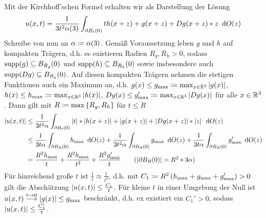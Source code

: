 \begin{exercisePage}
	Mit der Kirchhoff'schen Formel erhalten wir als Darstellung der Lösung
	\begin{equation*}
		u(x,t) = \frac{1}{3 t^2 \alpha(3)} \int_{\partial B_t(0)} t h(x+z) + g(x+z) + Dg(x+z) * z \enskip \mathrm{d}O(z)
	\end{equation*}
	Schreibe von nun an $\alpha \coloneqq \alpha(3)$. Gemäß Voraussetzung leben $g$ und $h$ auf kompakten Trägern, d.h. es existieren Radien $R_g, R_h >0$, sodass $\operatorname{supp}(g) \subseteq B_{R_g}(0)$ und $\operatorname{supp}(h) \subseteq B_{R_h}(0)$ sowie insbesondere auch $\operatorname{supp}(Dg) \subseteq B_{R_g}(0)$. Auf diesen kompakten Trägern nehmen die stetigen Funktionen auch ein Maximum an, d.h. $g(x) \le g_{\max} \coloneqq \max_{x \in \mathbb{R}^3}\left| g(x) \right|$, $h(x) \le h_{\max} \coloneqq \max_{x \in \mathbb{R}^3}\left| h(x) \right|$, $Dg(x) \le g'_{\max} \coloneqq \max_{x \in \mathbb{R}^3}\left| Dg(x) \right|$ für alle $x \in \mathbb{R}^3$. 
	Dann gilt mit $R \coloneqq \max\left\{ R_g, R_h \right\}$ für $t \le R$
	\begin{align*}
			\abs{u(x,t)} 
			&\le \frac{1}{3 t^2 \alpha} \int_{\rand B_t(0)} \abs{t} * \abs{h(x + z)} + \abs{g(x + z)} + \abs{Dg(x+z)} * \abs{z} \diffskip{O(z)} \\
			&\le \frac{1}{3 t \alpha} \int_{\rand B_R(0)} h_{\max} \diffskip{O(z)}
			+ \frac{1}{3 t^2 \alpha} \int_{\rand B_R(0)} g_{\max} \diffskip{O(z)}
			+ \frac{1}{3 t \alpha} \int_{\rand B_R(0)} g'_{\max} \diffskip{O(z)}\\
			&= \frac{R^2 h_{\max}}{t} + \frac{R^2 h_{\max}}{t^2} + \frac{R^2 g'_{\max}}{t} \tag{$\abs{\rand B_R(0)} = R^2 * 3\alpha$}
	\end{align*}
	Für hinreichend große $t$ ist $\frac{1}{t} \approx \frac{1}{t^2}$, d.h. mit $C_1 \coloneqq R^2 \left( h_{\max} + g_{\max} + g'_{\max} \right) > 0$ gilt die Abschätzung $\left| u(x,t) \right| \le \frac{C_1}{t}$. Für kleine $t$ in einer Umgebung der Null ist $u(x,t) \overset{t \to 0}{\longrightarrow} \left| g(x) \right| \le g_{\max}$ beschränkt, d.h. ex existiert ein $C_1'> 0$, sodass $\left| u(x,t) \right| \le \frac{C_1'}{t}$. 
	

\end{exercisePage}

